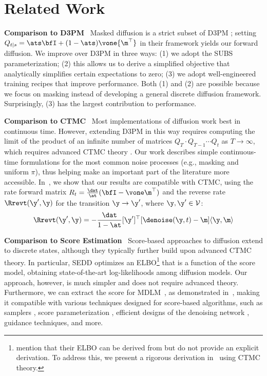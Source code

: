 \documentclass{article} %
\def\algo{MDLM}
\def\prior{\text{$\boldsymbol{\mathit{\pi}}$}}
\def\onehotset{\mathcal{V}}
\begin{document}
{\section{Related Work}\label{sec:discussion}
\textbf{Comparison to D3PM}~
Masked diffusion is a strict subset of D3PM \citep{austin2021structured}; setting $Q_{t|s} = \ats\bfI + (1-\ats) \vone {\m^\top}$ in their framework yields our forward diffusion.
We improve over D3PM in three ways: (1) we adopt the SUBS parameterization; (2) this allows us to derive a simplified objective that analytically simplifies certain expectations to zero; (3) we adopt well-engineered training recipes that improve performance. 
Both (1) and (2) are possible because we focus on masking instead of developing a general discrete diffusion framework.
Surprisingly, (3) has the largest contribution to performance.

\textbf{Comparison to CTMC}~
Most implementations of diffusion work best in continuous time. However, extending D3PM in this way requires computing the limit of the product of an infinite number of matrices $Q_T \cdot Q_{T-1} \cdots Q_t$ as $T \to \infty$, which requires advanced CTMC theory \citep{campbell2022continuous}. Our work describes simple continuous-time formulations for the most common noise processes (e.g., masking and uniform $\prior$), thus helping make an important part of the literature more accessible.
In~, we show that our results are compatible with CTMC, using the rate forward matrix $R_t = \frac{\dat}{\at} (\bfI - \vone \m^\top)$ and the reverse rate
$\Rrevt(\y', \y)$ for the transition
$\y \to \y'$, where
$\y, \y' \in \onehotset$:
{
\begin{align}
    \Rrevt(\y', \y) = - \frac{\dat}{1 - \at} [\y']^\top [\denoise (\y, t) - \m] \langle \y, \m \rangle
\end{align}
\vspace{-1em}
}

\textbf{Comparison to Score Estimation}~
Score-based approaches to diffusion \citep{song2019generative} extend to discrete states, although they typically further build upon advanced CTMC theory.
In particular, SEDD \citep{lou2023discrete} optimizes an ELBO\footnote{
\citet{lou2023discrete} mention that their ELBO can be derived from \citet{benton2022denoising, Hanson2007AppliedSP} but do not provide an explicit derivation. To address this, we present a rigorous derivation in~ using CTMC theory. 
}
that is a function of the score model, obtaining state-of-the-art log-likelihoods among diffusion models. Our approach, however, is much simpler and does not require advanced theory. Furthermore, we can extract the score for \algo{}~, as demonstrated in~, making it compatible with various techniques designed for score-based algorithms, such as samplers \citep{campbell2022continuous}, score parameterization \citep{lou2023discrete}, efficient designs of the denoising network \citep{sun2022score}, guidance techniques, and more.

}
\end{document}
